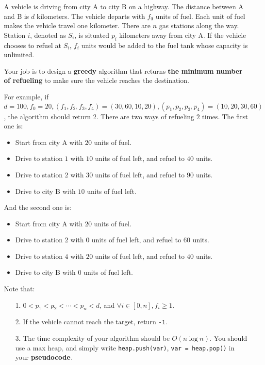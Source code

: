 
A vehicle is driving from city A to city B on a highway.
The distance between A and B is $d$ kilometers.
The vehicle departs with $f_0$ units of fuel.
Each unit of fuel makes the vehicle travel one kilometer.
There are $n$ gas stations along the way.
Station $i$, denoted as $S_i$, is situated $p_i$ kilometers away from city A\@.
If the vehicle chooses to refuel at $S_i$, $f_i$ units would be added to the fuel tank whose capacity is unlimited.

Your job is to design a \textbf{greedy} algorithm that returns \textbf{the minimum number of refueling} to make sure the vehicle reaches the destination.

For example, if $d=100, f_0=20, (f_1,f_2,f_3,f_4)=(30,60,10,20), (p_1,p_2,p_3,p_4)=(10,20,30,60)$, the algorithm should return $2$.
There are two ways of refueling $2$ times.
The first one is:
\begin{itemize}
    \item Start from city A with $20$ units of fuel.
    \item Drive to station $1$ with $10$ units of fuel left, and refuel to $40$ units.
    \item Drive to station $2$ with $30$ units of fuel left, and refuel to $90$ units.
    \item Drive to city B with $10$ units of fuel left.
\end{itemize}
And the second one is:
\begin{itemize}
    \item Start from city A with $20$ units of fuel.
    \item Drive to station $2$ with $0$ units of fuel left, and refuel to $60$ units.
    \item Drive to station $4$ with $20$ units of fuel left, and refuel to $40$ units.
    \item Drive to city B with $0$ units of fuel left.
\end{itemize}

Note that:
\begin{enumerate}
    \item[1.] $0<p_1<p_2<\cdots<p_n<d$, and $\forall i\in[0,n],f_i\ge 1$.
    \item[2.] If the vehicle cannot reach the target, return \texttt{-1}.
    \item[3.] The time complexity of your algorithm should be $O(n\log n)$.
    You should use a max heap, and simply write \lstinline{heap.push(var)}, \lstinline{var = heap.pop()} in your \textbf{pseudocode}.
\end{enumerate}

